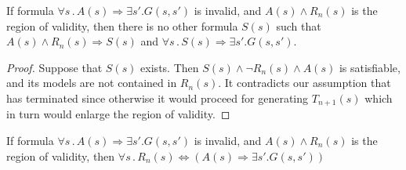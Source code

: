\begin{lemma}
If formula $\forall s \,.\,  A(s) \Rightarrow \exists s' . G(s,s')$ is invalid, and $A(s) \land R_n(s)$ is the region of validity, then there is no other formula $S(s)$ such that $A(s) \land R_n(s) \Rightarrow S(s)$ and $\forall s \,.\,  S(s) \Rightarrow \exists s' . G(s,s')$.
\label{lem:subset}
\end{lemma}

\begin{proof}
Suppose that $S(s)$ exists.
Then $S(s) \land \neg{R_n(s)} \land A(s)$ is satisfiable, and its models are not contained in $R_n(s)$.
It contradicts our assumption that \aeval has terminated since otherwise it would proceed for generating $T_{n+1}(s)$ which in turn would enlarge the region of validity.
\end{proof}

\begin{corollary}
If formula $\forall s \,.\,  A(s) \Rightarrow \exists s' . G(s,s')$ is invalid, and $A(s) \land R_n(s)$ is the region of validity, then 
 $\forall s \,.\, R_n(s) \Leftrightarrow (A(s) \Rightarrow \exists s' . G(s,s'))$ 
\label{cor:subset}
\end{corollary}

